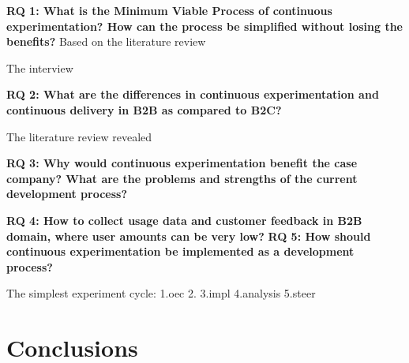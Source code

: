 \documentclass[english]{tktltiki2}
\theoremstyle{definition}
\theoremstyle{remark}
\begin{document}
\textbf{RQ 1: What is the Minimum Viable Process of continuous experimentation? How can the process be simplified without losing the benefits?}
Based on the literature review

The interview

\textbf{RQ 2: What are the differences in continuous experimentation and continuous delivery in B2B as compared to B2C?}

The literature review revealed

\textbf{RQ 3: Why would continuous experimentation benefit the case company? What are the problems and strengths of the current development process?}


\textbf{RQ 4: How to collect usage data and customer feedback in B2B domain, where user amounts can be very low?}
\textbf{RQ 5: How should continuous experimentation be implemented as a development process?}


The simplest experiment cycle:
1.oec
2.
3.impl
4.analysis
5.steer

\section{Conclusions}


%
%
% 
%







% 
\end{document}
